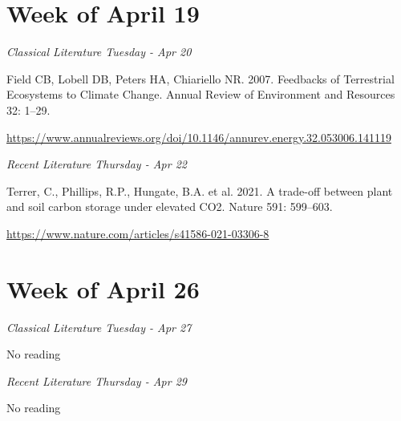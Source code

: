 \documentclass[12pt, notitlepage]{article}   	%
\begin{document}
{\section*{Week of April 19}
\textit{Classical Literature Tuesday - Apr 20} \par
Field CB, Lobell DB, Peters HA, Chiariello NR. 2007. Feedbacks of Terrestrial Ecosystems 
to Climate Change. Annual Review of Environment and Resources 32: 1–29. \par
\url{https://www.annualreviews.org/doi/10.1146/annurev.energy.32.053006.141119}

\textit{Recent Literature Thursday - Apr 22} \par
Terrer, C., Phillips, R.P., Hungate, B.A. et al. 2021. 
A trade-off between plant and soil carbon storage under elevated CO2. Nature 591: 599–603. \par
\url{https://www.nature.com/articles/s41586-021-03306-8}

\section*{Week of April 26}
\textit{Classical Literature Tuesday - Apr 27} \par
No reading \par

\textit{Recent Literature Thursday - Apr 29} \par
No reading \par

} %
\end{document}
